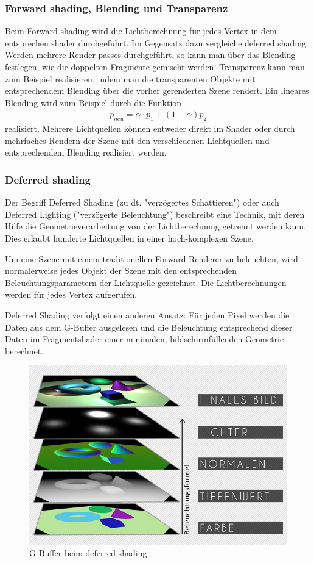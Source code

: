 \subsubsection{ Forward shading, Blending und Transparenz}
Beim Forward shading wird die Lichtberechnung für jedes Vertex in dem entsprechen shader durchgeführt. Im Gegensatz dazu vergleiche deferred shading.
Werden mehrere Render passes durchgeführt, so kann man über das Blending festlegen, wie die doppelten Fragmente gemischt werden.
Transparenz kann man zum Beispiel realisieren, indem man die transparenten Objekte mit entsprechendem Blending über die vorher gerenderten  Szene rendert.
Ein lineares Blending wird zum Beispiel durch die Funktion 
\begin{align}
p_{neu} = \alpha \cdot p_1 + (1- \alpha)p_2
\end{align}
realisiert. Mehrere Lichtquellen können entweder direkt im Shader oder durch mehrfaches Rendern der Szene mit den verschiedenen Lichtquellen und entsprechendem Blending realisiert werden.
\subsubsection{Deferred shading}
Der Begriff Deferred Shading (zu dt. "verzögertes Schattieren") oder auch Deferred Lighting ("verzögerte Beleuchtung") beschreibt eine Technik, mit deren Hilfe die Geometrieverarbeitung von der Lichtberechnung getrennt werden kann. Dies erlaubt hunderte Lichtquellen in einer hoch-komplexen Szene.


Um eine Szene mit einem traditionellen Forward-Renderer zu beleuchten, wird normalerweise jedes Objekt der Szene mit den entsprechenden Beleuchtungsparametern der Lichtquelle gezeichnet. 
Die Lichtberechnungen werden für jedes Vertex aufgerufen.

Deferred Shading verfolgt einen anderen Ansatz: Für jeden Pixel werden die Daten aus dem G-Buffer ausgelesen und die Beleuchtung entsprechend dieser Daten im Fragmentshader einer minimalen, bildschirmfüllenden Geometrie berechnet. 


\begin{figure}[H]
    \centering
    \includegraphics[width=1.0\textwidth]{images/deffered_shading.jpg}
    \caption{G-Buffer beim deferred shading} %
    \label{fig:defferedshading}
\end{figure} 

